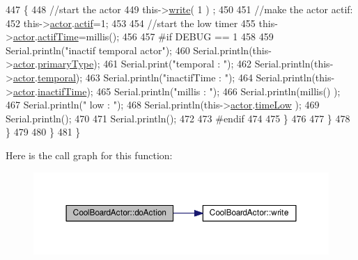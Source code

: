 \begin{DoxyCode}
447                 \{
448                     \textcolor{comment}{//start the actor}
449                     this->\hyperlink{class_cool_board_actor_a958786ff01ea1056ee72c72d439f86da}{write}( 1 ) ;
450 
451                     \textcolor{comment}{//make the actor actif:}
452                     this->\hyperlink{class_cool_board_actor_a8f190db9f7a39fddbcef7f152da970e9}{actor}.\hyperlink{struct_cool_board_actor_1_1state_a7963178c2de01ef0d2861f9f59ad6f3c}{actif}=1;
453 
454                     \textcolor{comment}{//start the low timer}
455                     this->\hyperlink{class_cool_board_actor_a8f190db9f7a39fddbcef7f152da970e9}{actor}.\hyperlink{struct_cool_board_actor_1_1state_a534119a22a09b29ecb446b277d5b2ef5}{actifTime}=millis();
456 
457 \textcolor{preprocessor}{                #if DEBUG == 1 }
458                     
459                     Serial.println(\textcolor{stringliteral}{"inactif temporal actor"});
460                     Serial.println(this->\hyperlink{class_cool_board_actor_a8f190db9f7a39fddbcef7f152da970e9}{actor}.\hyperlink{struct_cool_board_actor_1_1state_a8a0b318fd2814cf67fe74ee8164df55e}{primaryType});
461                     Serial.print(\textcolor{stringliteral}{"temporal : "});
462                     Serial.println(this->\hyperlink{class_cool_board_actor_a8f190db9f7a39fddbcef7f152da970e9}{actor}.\hyperlink{struct_cool_board_actor_1_1state_a6442a8c3a30abc48472f3e5284b786ea}{temporal});
463                     Serial.println(\textcolor{stringliteral}{"inactifTime : "});
464                     Serial.println(this->\hyperlink{class_cool_board_actor_a8f190db9f7a39fddbcef7f152da970e9}{actor}.\hyperlink{struct_cool_board_actor_1_1state_a6d88835f4402b3b81cd404784281854b}{inactifTime});
465                     Serial.println(\textcolor{stringliteral}{"millis : "});
466                     Serial.println(millis() );
467                     Serial.println(\textcolor{stringliteral}{" low : "});
468                     Serial.println(this->\hyperlink{class_cool_board_actor_a8f190db9f7a39fddbcef7f152da970e9}{actor}.\hyperlink{struct_cool_board_actor_1_1state_a314c53c146e8c7b12c025323a34fbb9a}{timeLow} );
469                     Serial.println();
470 
471                     Serial.println();
472                 
473 \textcolor{preprocessor}{                #endif}
474             
475                 \}           
476         
477             \}
478         \}
479         
480     \} 
481 \}
\end{DoxyCode}
Here is the call graph for this function\+:
\nopagebreak
\begin{figure}[H]
\begin{center}
\leavevmode
\includegraphics[width=350pt]{dc/d69/class_cool_board_actor_a96a45658d32c6b95caa2f385c7da32cd_cgraph}
\end{center}
\end{figure}
